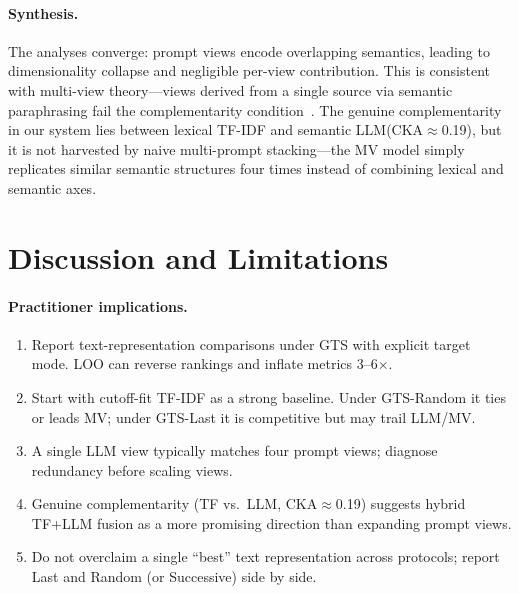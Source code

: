 \documentclass[sigconf,natbib=true,anonymous]{acmart}
\newcommand{\tfidf}{\textsc{TF-IDF}\xspace}
\newcommand{\llm}{\textsc{LLM}\xspace}
\begin{document}
\paragraph{Synthesis.}
The analyses converge: prompt views encode overlapping semantics, leading to dimensionality collapse and negligible per-view contribution.
This is consistent with multi-view theory---views derived from a single source via semantic paraphrasing fail the complementarity condition~\cite{xu2013multiview}.
The genuine complementarity in our system lies between lexical \tfidf and semantic \llm (CKA$\approx$0.19), but it is not harvested by naive multi-prompt stacking---the MV model simply replicates similar semantic structures four times instead of combining lexical and semantic axes.

\section{Discussion and Limitations}
\label{sec:discussion}

\paragraph{Practitioner implications.}
\begin{enumerate}[leftmargin=*,itemsep=2pt]
\item Report text-representation comparisons under GTS with explicit target mode.  LOO can reverse rankings and inflate metrics 3--6$\times$.
\item Start with cutoff-fit \tfidf as a strong baseline.  Under GTS-Random it ties or leads MV; under GTS-Last it is competitive but may trail LLM/MV.
\item A single \llm view typically matches four prompt views; diagnose redundancy before scaling views.
\item Genuine complementarity (TF vs.\ LLM, CKA$\approx$0.19) suggests hybrid TF+LLM fusion as a more promising direction than expanding prompt views.
\item Do not overclaim a single ``best'' text representation across protocols; report Last and Random (or Successive) side by side.
\end{enumerate}
\end{document}
